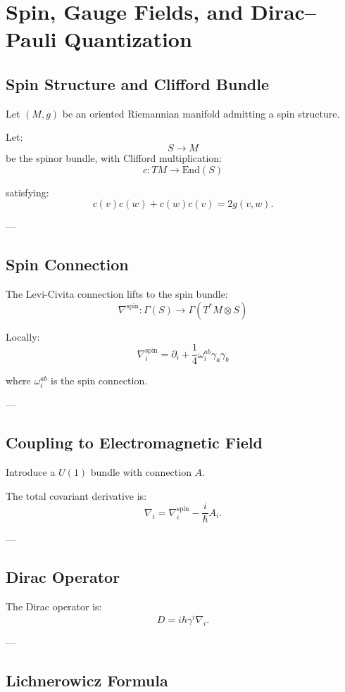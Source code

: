 \section{Spin, Gauge Fields, and Dirac--Pauli Quantization}

\subsection{Spin Structure and Clifford Bundle}

Let $(M,g)$ be an oriented Riemannian manifold admitting a spin structure.

Let:
\[
S \to M
\]
be the spinor bundle, with Clifford multiplication:
\[
c: TM \to \mathrm{End}(S)
\]

satisfying:
\[
c(v)c(w) + c(w)c(v) = 2g(v,w).
\]

---

\subsection{Spin Connection}

The Levi-Civita connection lifts to the spin bundle:
\[
\nabla^{\mathrm{spin}}: \Gamma(S) \to \Gamma(T^*M \otimes S)
\]

Locally:
\[
\nabla^{\mathrm{spin}}_i = \partial_i + \frac{1}{4}\omega_i^{ab}\gamma_a \gamma_b
\]

where $\omega_i^{ab}$ is the spin connection.

---

\subsection{Coupling to Electromagnetic Field}

Introduce a $U(1)$ bundle with connection $A$.

The total covariant derivative is:
\[
\nabla_i = \nabla^{\mathrm{spin}}_i - \frac{i}{\hbar}A_i.
\]

---

\subsection{Dirac Operator}

\begin{definition}
The Dirac operator is:
\[
D = i\hbar \gamma^i \nabla_i.
\]
\end{definition}

---

\subsection{Lichnerowicz Formula}

